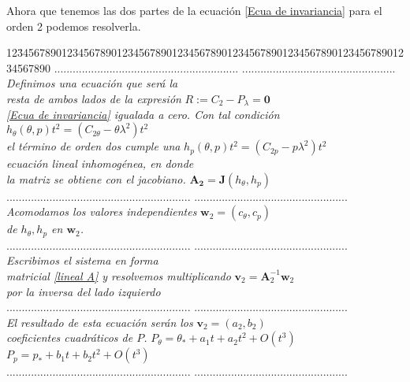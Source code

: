 Ahora que tenemos las dos partes de la ecuación \ref{Ecua de invariancia} para el orden 2 podemos resolverla.
\begin{tabbing}
12\=34567890123456789012345678901234567890123456\=7890123456789012345678901234567890\kill%
\>............................................................  \>..................................................\\
\>\textsl{Definimos una ecuación que será la } \> \\
\>\textsl{resta de ambos lados de la expresión} \> $R :=C_{2}-P_{\lambda}=\mathbf{0} $\\
\>\textsl{\ref{Ecua de invariancia} igualada a cero. Con tal condición} \> $h_{\theta}(\theta,p)t^{2}=(C_{2\theta}-\theta\lambda^{2})t^{2} $\\
\>\textsl{el término de orden dos cumple una} \> $h_{p}(\theta,p)t^{2}=(C_{2p}-p\lambda^{2})t^{2}$\\
\>\textsl{ecuación lineal inhomogénea, en donde}\> \\
\>\textsl{la matriz se obtiene con el jacobiano. }\> $\mathbf{A_{2}}=\mathbf{J}(h_{\theta},h_{p})$\\ 
\>............................................................  \>..................................................\\
\>\textsl{Acomodamos los valores independientes }\> $\mathbf{w}_{2}=(c_{\theta},c_{p})$\\
\>\textsl{ de $h_{\theta},h_{p}$ en $\mathbf{w}_{2}$.} \> \\
\>............................................................  \>..................................................\\
\>\textsl{Escribimos el sistema en forma} \> \\
\>\textsl{matricial \ref{lineal A} y resolvemos multiplicando} \> $\mathbf{v}_{2}=\mathbf{A}_{2}^{-1}\mathbf{w}_{2}$\\ 
\>\textsl{por la inversa del lado izquierdo}  \>\\
\>............................................................  \>..................................................\\
\>\textsl{El resultado de esta ecuación serán los} \> $\mathbf{v}_{2}=(a_{2},b_{2})$ \\
\>\textsl{coeficientes cuadráticos de $P$.} \>  $P_{\theta}=\theta_{*}+a_{1}t+a_{2}t^{2}+O(t^{3})$ \\
\> \> $P_{p}=p_{*}+b_{1}t+b_{2}t^{2}+O(t^{3})$\\
\>............................................................  \>..................................................\\
\end{tabbing}

